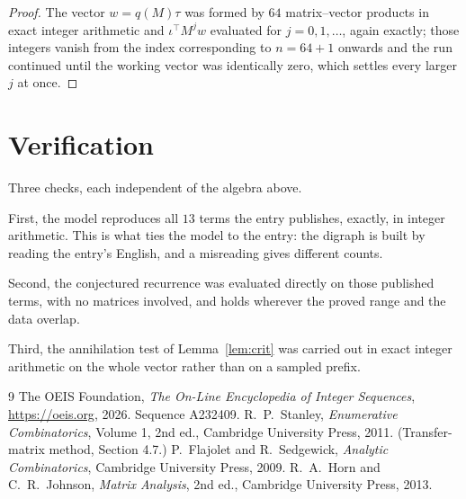 \documentclass[11pt,a4paper]{article}
\theoremstyle{plain}
\theoremstyle{definition}
\begin{document}
\begin{proof}
The vector $w=q(M)\tau$ was formed by $64$ matrix--vector products in exact integer
arithmetic and $\iota^{\!\top}M^{j}w$ evaluated for $j=0,1,\dots$, again exactly; those
integers vanish from the index corresponding to $n=64+1$ onwards and the run continued
until the working vector was identically zero, which settles every larger $j$ at once.
\end{proof}

\section{Verification}

Three checks, each independent of the algebra above.

First, the model reproduces all $13$ terms the entry publishes, exactly, in integer
arithmetic. This is what ties the model to the entry: the digraph is built by reading the
entry's English, and a misreading gives different counts.

Second, the conjectured recurrence was evaluated directly on those published terms, with no
matrices involved, and holds wherever the proved range and the data overlap.

Third, the annihilation test of Lemma~\ref{lem:crit} was carried out in exact integer
arithmetic on the whole vector rather than on a sampled prefix.

\begin{thebibliography}{9}
 The OEIS Foundation, \emph{The On-Line Encyclopedia of Integer
Sequences}, \url{https://oeis.org}, 2026. Sequence A232409.
 R.~P.~Stanley, \emph{Enumerative Combinatorics}, Volume 1, 2nd ed.,
Cambridge University Press, 2011. (Transfer-matrix method, Section 4.7.)
 P.~Flajolet and R.~Sedgewick, \emph{Analytic Combinatorics}, Cambridge
University Press, 2009.
 R.~A.~Horn and C.~R.~Johnson, \emph{Matrix Analysis}, 2nd ed., Cambridge
University Press, 2013.
\end{thebibliography}
\end{document}
